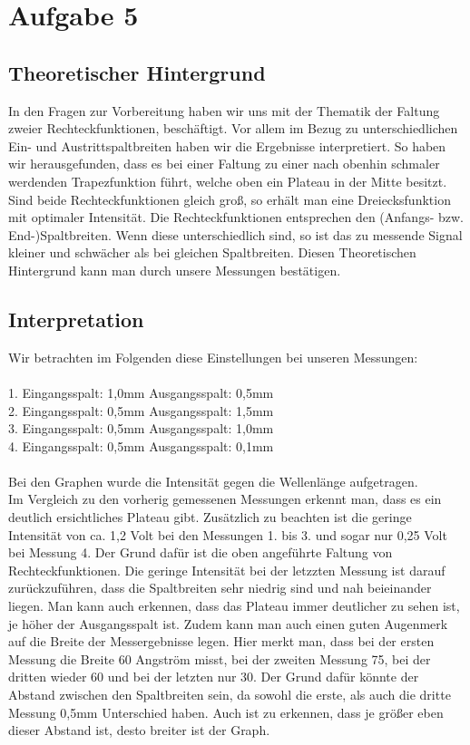 \section{Aufgabe 5}
\subsection {Theoretischer Hintergrund}
In den Fragen zur Vorbereitung haben wir uns mit der Thematik der Faltung zweier Rechteckfunktionen, besch\"aftigt. Vor allem im Bezug zu unterschiedlichen Ein- und Austrittspaltbreiten haben wir die Ergebnisse interpretiert. So haben wir herausgefunden, dass es bei einer Faltung zu einer nach obenhin schmaler werdenden Trapezfunktion f\"uhrt, welche oben ein Plateau in der Mitte besitzt. \\
Sind beide Rechteckfunktionen gleich gro\ss{}, so erh\"alt man eine Dreiecksfunktion mit optimaler Intensit\"at. Die Rechteckfunktionen entsprechen den (Anfangs- bzw. End-)Spaltbreiten. Wenn diese unterschiedlich sind, so ist das zu messende Signal kleiner und schw\"acher als bei gleichen Spaltbreiten. Diesen Theoretischen Hintergrund kann man durch unsere Messungen best\"atigen. 

\subsection {Interpretation} 
Wir betrachten im Folgenden diese Einstellungen bei unseren Messungen:\\\\
1. Eingangsspalt: 1,0mm \tab Ausgangsspalt: 0,5mm\\
2. Eingangsspalt: 0,5mm \tab Ausgangsspalt: 1,5mm\\
3. Eingangsspalt: 0,5mm \tab Ausgangsspalt: 1,0mm\\
4. Eingangsspalt: 0,5mm \tab Ausgangsspalt: 0,1mm\\
 \\
Bei den Graphen wurde die Intensit\"at gegen die Wellenl\"ange aufgetragen. \\
Im Vergleich zu den vorherig gemessenen Messungen erkennt man, dass es ein deutlich ersichtliches Plateau gibt.
Zus\"atzlich zu beachten ist die geringe Intensit\"at von ca. 1,2 Volt bei den Messungen 1. bis 3. und sogar nur 0,25 Volt bei Messung 4. Der Grund daf\"ur ist die oben angef\"uhrte Faltung von Rechteckfunktionen. Die geringe Intensit\"at bei der letzzten Messung ist darauf zur\"uckzuf\"uhren, dass die Spaltbreiten sehr niedrig sind und nah beieinander liegen. Man kann auch erkennen, dass das Plateau immer deutlicher zu sehen ist, je h\"oher der Ausgangsspalt ist. Zudem kann man auch einen guten Augenmerk auf die Breite der Messergebnisse legen. Hier merkt man, dass bei der ersten Messung die Breite 60 Angstr\"om misst, bei der zweiten Messung 75, bei der dritten wieder 60 und bei der letzten nur 30. Der Grund daf\"ur k\"onnte der Abstand zwischen den Spaltbreiten sein, da sowohl die erste, als auch die dritte Messung 0,5mm Unterschied haben. Auch ist zu erkennen, dass je gr\"o\ss{}er eben dieser Abstand ist, desto breiter ist der Graph. \\








